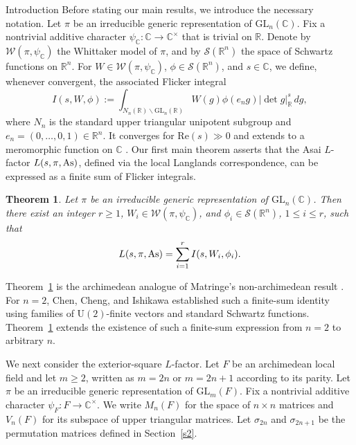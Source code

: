 \documentclass[12pt,reqno]{amsart}
\numberwithin{equation}{section}%
\numberwithin{equation}{subsection}
\newtheorem{thm}[equation]{Theorem}%
\theoremstyle{definition}
\theoremstyle{remark}
\begin{document}
\begin{section}{Introduction}
Before stating our
main results, we introduce the necessary notation. Let \(\pi\) be an irreducible generic representation of
\(\mathrm{GL}_n(\mathbb{C})\). Fix a nontrivial additive character
\(\psi_\mathbb{C} \colon \mathbb{C} \to \mathbb{C}^{\times}\) that is trivial on \(\mathbb{R}\). Denote by \(\mathcal{W}(\pi,\psi_\mathbb{C})\) the Whittaker model of \(\pi\), and by
\(\mathcal{S}(\mathbb{R}^n)\) the space of Schwartz functions on \(\mathbb{R}^n\).
For \(W \in \mathcal{W}(\pi,\psi_\mathbb{C})\), \(\phi \in \mathcal{S}(\mathbb{R}^n)\), and \(s \in \mathbb{C}\), we define,
whenever convergent, the associated Flicker integral \cite{Fli1993,FZ1995} 
\[
  I(s,W,\phi)
  :=
  \int_{N_n(\mathbb{R})\backslash \mathrm{GL}_n(\mathbb{R})}
  W(g)\phi(e_ng)|\det g|_{\mathbb{R}}^s\,dg,
\]
where \(N_n\) is the standard upper triangular unipotent subgroup and
\(e_n=(0,\ldots,0,1)\in \mathbb{R}^n\). It converges for \(\mathrm{Re}(s) \gg 0\) and extends to a meromorphic function on $\mathbb{C}$ \cite{BP2021}. Our first main theorem asserts that the Asai \(L\)-factor
\(L(s,\pi,{\rm As})\), defined via the local Langlands correspondence, can be
expressed as a finite sum of Flicker integrals.

\begin{thm}\label{main1}
Let \(\pi\) be an irreducible generic representation of
\(\mathrm{GL}_n(\mathbb{C})\). Then there exist an integer \(r\geq 1\),
\(W_i\in\mathcal{W}(\pi,\psi_{\mathbb{C}})\), and
\(\phi_i\in\mathcal{S}(\mathbb{R}^n)\), \(1\leq i\leq r\), such that
\[
L(s,\pi,{\rm As})=\sum_{i=1}^r I(s,W_i,\phi_i).
\]
\end{thm}



Theorem~\ref{main1} is the archimedean analogue of Matringe's
non-archimedean result \cite[Theorem~5.3]{Mat2011}. For \(n=2\), Chen, Cheng, and Ishikawa
\cite[Theorem~3.1(3)]{CCI2020} established such a finite-sum identity
using families of \(\mathrm{U}(2)\)-finite vectors and standard Schwartz
functions. Theorem~\ref{main1} extends the existence of such a finite-sum
expression from \(n=2\) to arbitrary \(n\).


\par
We next consider the exterior-square \(L\)-factor. Let \(F\) be an
archimedean local field and let \(m\geq2\), written as \(m=2n\) or \(m=2n+1\) according to its parity. Let \(\pi\) be an irreducible generic representation of
\(\mathrm{GL}_m(F)\). Fix a nontrivial additive character
\(\psi_F\colon F\to\mathbb{C}^{\times}\). 
We write \(M_n(F)\) for the space of \(n\times n\) matrices and \(V_n(F)\) for its subspace of upper triangular matrices. Let \(\sigma_{2n}\) and \(\sigma_{2n+1}\) be the permutation matrices defined in Section~\ref{s2}.


\end{section}
\end{document}
